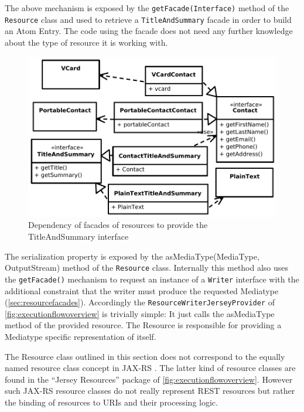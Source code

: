 \documentclass[11pt,a4paper,headsepline,twoside]{scrartcl}		%
\begin{document}
The above mechanism is exposed by the \lstinline:getFacade(Interface): method of
the \lstinline:Resource: class and used to retrieve a
\lstinline:TitleAndSummary: facade in order to build an Atom Entry. The code
using the facade does not need any further knowledge about the type of resource
it is working with.

\begin{figure}[htb]
  \centering
  \includegraphics[width=1\textwidth]{titleandsummary}

  \caption{Dependency of facades of resources to provide the TitleAndSummary interface}
  \label{fig:titleandsummary}
\end{figure}

The serialization property is exposed by the asMediaType(MediaType,
OutputStream) method of the \lstinline:Resource: class. Internally this method
also uses the \lstinline:getFacade(): mechanism to request an instance of a
\lstinline:Writer: interface with the additional constraint that the writer must
produce the requested Mediatype (\autoref{sec:resourcefacades}). Accordingly the
\lstinline:ResourceWriterJerseyProvider: of \autoref{fig:executionflowoverview}
is trivially simple: It just calls the asMediaType method of the provided
resource. The Resource is responsible for providing a Mediatype specific
representation of itself.

The Resource class outlined in this section does not correspond to the equally
named resource class concept in JAX-RS \cite{JAX-RS1.1}. The latter kind of
resource classes are found in the ``Jersey Resources'' package of
\autoref{fig:executionflowoverview}. However such JAX-RS resource classes do not
really represent REST resources but rather the binding of resources to URIs and
their processing logic.
\end{document}
